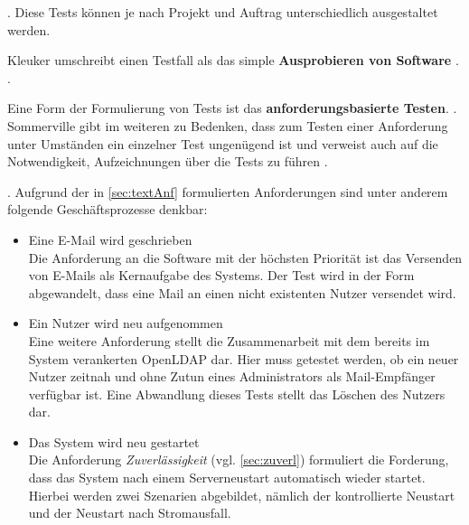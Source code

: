  \citep[][266]{Sommerville2012}. 
Diese Tests können je nach Projekt und Auftrag unterschiedlich ausgestaltet werden.  

Kleuker umschreibt einen Testfall als das simple \textbf{Ausprobieren von Software} \citep[vgl.][26]{Kleuker2019}. 
 \citep[][26]{Kleuker2019}.

Eine Form der Formulierung von Tests ist das \textbf{anforderungsbasierte Testen}.
 \citep[][266]{Sommerville2012}.
Sommerville gibt im weiteren zu Bedenken, dass zum Testen einer Anforderung unter Umständen ein einzelner Test ungenügend ist und verweist auch auf die Notwendigkeit, Aufzeichnungen über die Tests zu führen \citep[vgl.][27]{Kleuker2019}.

 \citep[][161]{Witte2019}. Aufgrund der in \autoref{sec:textAnf} formulierten Anforderungen sind unter anderem folgende Geschäftsprozesse denkbar:
\begin{itemize}
	\item Eine E-Mail wird geschrieben\\
	Die Anforderung an die Software mit der höchsten Priorität ist das Versenden von E-Mails als Kernaufgabe des Systems. Der Test wird  in der Form abgewandelt, dass eine Mail an einen nicht existenten Nutzer versendet wird.
	\item Ein Nutzer wird neu aufgenommen\\
	Eine weitere Anforderung stellt die Zusammenarbeit mit dem bereits im System verankerten OpenLDAP dar. Hier muss getestet werden, ob ein neuer Nutzer zeitnah und ohne Zutun eines Administrators als Mail-Empfänger verfügbar ist. Eine Abwandlung dieses Tests stellt das Löschen des Nutzers dar.
	\item Das System wird neu gestartet \\
	Die Anforderung \textit{Zuverlässigkeit} (vgl. \autoref{sec:zuverl}) formuliert die Forderung, dass das System nach einem Serverneustart automatisch wieder startet. Hierbei werden zwei Szenarien abgebildet, nämlich der kontrollierte Neustart und der Neustart nach Stromausfall.
\end{itemize}


